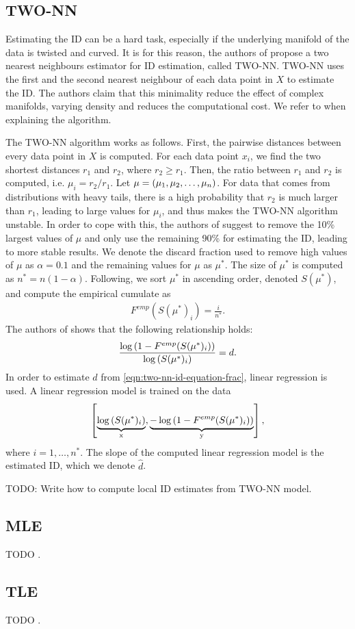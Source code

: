 \subsection{TWO-NN}
Estimating the ID can be a hard task, especially if the underlying manifold of the data is twisted and curved. It is for this reason, the authors of \cite{Facco2017twonn} propose a two nearest neighbours estimator for ID estimation, called TWO-NN. TWO-NN uses the first and the second nearest neighbour of each data point in $X$ to estimate the ID. The authors claim that this minimality reduce the effect of complex manifolds, varying density and reduces the computational cost. We refer to \cite{Facco2017twonn} when explaining the algorithm.

The TWO-NN algorithm works as follows. First, the pairwise distances between every data point in $X$ is computed. For each data point $x_i$, we find the two shortest distances $r_1$ and $r_2$, where $r_2 \geq r_1$. Then, the ratio between $r_1$ and $r_2$ is computed, i.e. $\mu_i = r_2 / r_1$. Let $\mu = \left(\mu_1, \mu_2, \ldots, \mu_n\right)$. For data that comes from distributions with heavy tails, there is a high probability that $r_2$ is much larger than $r_1$, leading to large values for $\mu_i$, and thus makes the TWO-NN algorithm unstable. In order to cope with this, the authors of \cite{Facco2017twonn} suggest to remove the 10\% largest values of $\mu$ and only use the remaining 90\% for estimating the ID, leading to more stable results. We denote the discard fraction used to remove high values of $\mu$ as $\alpha=0.1$ and the remaining values for $\mu$ as $\mu^*$. The size of $\mu^*$ is computed as $n^* = n(1-\alpha)$. Following, we sort $\mu^*$ in ascending order, denoted $S(\mu^*)$, and compute the empirical cumulate as
\begin{align}
    F^{emp}(S(\mu^*)_i) = \frac{i}{n^*}.
\end{align}
The authors of \cite{Facco2017twonn} shows that the following relationship holds:
\begin{align}
    \frac{\log \left(1 - F^{emp}(S(\mu^*)_i)\right)}{\log \left(S(\mu^*)_i\right)} = d.
    \label{eqn:two-nn-id-equation-frac}
\end{align}
In order to estimate $d$ from \cref{eqn:two-nn-id-equation-frac}, linear regression is used. A linear regression model is trained on the data
\begin{align}
    \enclb{\undertext{\log \enclp{S(\mu^*)_i}}{x}, \undertext{-\log \enclp{1 - F^{emp}(S(\mu^*)_i)}}{y}},
\end{align}
where $i = 1, \ldots, n^*$. The slope of the computed linear regression model is the estimated ID, which we denote $\hat{d}$.

TODO: Write how to compute local ID estimates from TWO-NN model.

\subsection{MLE}
TODO \cite{Haro2008}.

\subsection{TLE}
TODO \cite{Amsaleg2019}.